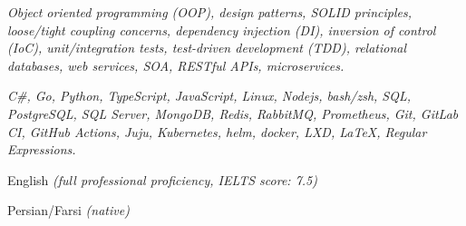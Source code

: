 \documentclass[9pt,a4paper]{extarticle}
\begin{document}
\begin{customitemize}
    \item {}
    \item {}
    \item {}
\end{customitemize}
\sectionrule{}

\begin{customitemize}
    \item {}
    \begin{customitemize}
        \item[] {\textit{Object oriented programming (OOP), design patterns, SOLID principles,
                        loose/tight coupling concerns, dependency injection (DI), inversion of
                        control (IoC), unit/integration tests, test-driven development (TDD),
                        relational databases, web services, SOA, RESTful APIs, microservices.
                    }}
    \end{customitemize}
    \item {}
    \begin{customitemize}
        \item[] {
                    \textit{C\#,
                        Go,
                        Python,
                        TypeScript,
                        JavaScript,
                        Linux,
                        Nodejs,
                        bash/zsh,
                        SQL,
                        PostgreSQL,
                        SQL Server,
                        MongoDB,
                        Redis,
                        RabbitMQ,
                        Prometheus,
                        Git,
                        GitLab CI,
                        GitHub Actions,
                        Juju,
                        Kubernetes,
                        helm,
                        docker,
                        LXD,
                        \LaTeX,
                        Regular Expressions.}
              }
    \end{customitemize}
    \item {}
    \begin{customitemize}
        \item {English \textit{(full professional proficiency, IELTS score: 7.5)}}
        \item {Persian/Farsi \textit{(native)}}
    \end{customitemize}
\end{customitemize}
\sectionrule{}
\end{document}
